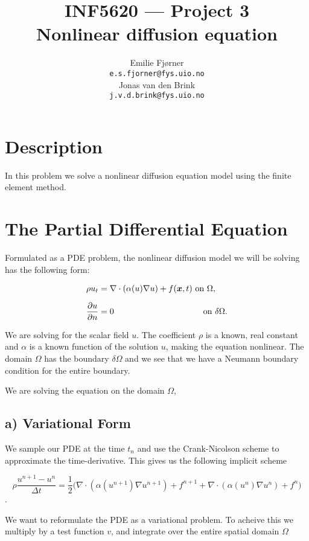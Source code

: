 \documentclass[a4paper, 11pt, notitlepage, english]{article}
\author{Emilie Fjørner \\[-0.4cm] \texttt{e.s.fjorner@fys.uio.no} \\[0.2cm] Jonas van den Brink \\[-0.4cm] \texttt{j.v.d.brink@fys.uio.no}}
\title{INF5620 --- Project 3 \\ Nonlinear diffusion equation}
\newcommand{\bt}[1]{\boldsymbol{#1}}
\newcommand{\p}{\partial}
\begin{document}
\maketitle

\vspace{1cm}

\section*{Description}


In this problem we solve a nonlinear diffusion equation model using the finite element method.

\clearpage

\section*{The Partial Differential Equation}

Formulated as a PDE problem, the nonlinear diffusion model we will be solving has the following form:

\begin{align} 
\rho u_t &= \nabla \cdot (\alpha(u)\nabla u) + f(\bt{x},t) \mbox{ on } \Omega, \\[0.2cm]
\frac{\p u}{\p n} &= 0 \hspace{3.6cm} \mbox{ on } \delta \Omega.
\end{align}

We are solving for the scalar field $u$. The coefficient $\rho$ is a known, real constant and $\alpha$ is a known function of the solution $u$, making the equation 
nonlinear. The domain $\Omega$ has the boundary $\delta\Omega$ and we see that we have a Neumann boundary condition for the entire boundary.

We are solving the equation on the domain $\Omega$, 

\subsection*{a) Variational Form}

We sample our PDE at the time $t_n$ and use the Crank-Nicolson scheme to approximate the time-derivative. This gives us the following implicit scheme

$$ \rho \frac{u^{n+1}-u^n}{\Delta t} = \frac{1}{2} \bigg(\nabla \cdot (\alpha(u^{n+1})\nabla u^{n+1}) + f^{n+1} + \nabla \cdot (\alpha(u^n)\nabla u^n) + f^n\bigg)$$.

We want to reformulate the PDE as a variational problem. To acheive this we multiply by a test function $v$, and integrate over the entire spatial domain $\Omega$
\end{document}
